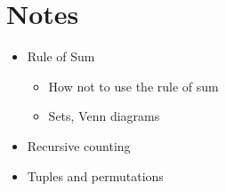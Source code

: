 \chapter*{Notes}

\begin{itemize}[noitemsep]
\item 
	Rule of Sum
	\begin{itemize}[noitemsep]
	\item How not to use the rule of sum
	\item Sets, Venn diagrams
	\end{itemize}

\item
	Recursive counting

\item
	Tuples and permutations
\end{itemize}

